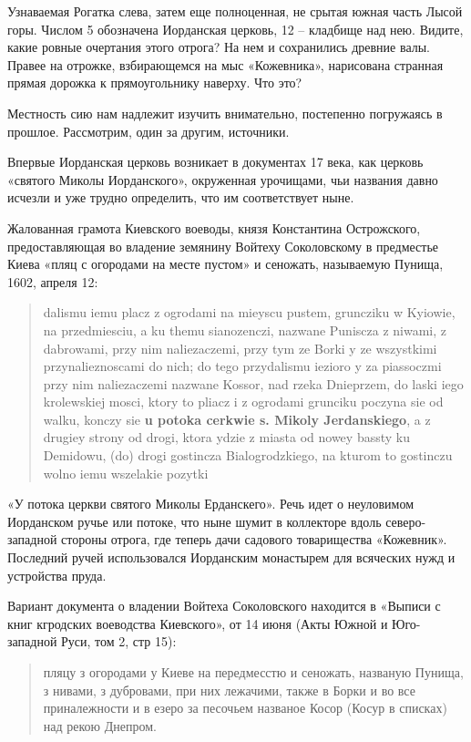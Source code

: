 Узнаваемая Рогатка слева, затем еще полноценная, не срытая южная часть Лысой горы. Числом 5 обозначена Иорданская церковь, 12 – кладбище над нею. Видите, какие ровные очертания этого отрога? На нем и сохранились древние валы. Правее на отрожке, взбирающемся на мыс «Кожевника», нарисована странная прямая дорожка к прямоугольнику наверху. Что это? 

Местность сию нам надлежит изучить внимательно, постепенно погружаясь в прошлое. Рассмотрим, один за другим, источники.

Впервые Иорданская церковь возникает в документах 17 века, как церковь «святого Миколы Иорданского», окруженная урочищами, чьи названия давно исчезли и уже трудно определить, что им соответствует ныне.

Жалованная грамота Киевского воеводы, князя Константина Острожского, предоставляющая во владение земянину Войтеху Соколовскому в предместье Киева «пляц с огородами на месте пустом» и сеножать, называемую Пунища, 1602, апреля 12:
\begin{otherlanguage}{polish}
\begin{quotation}
dalismu iemu placz z ogrodami na mieyscu pustem, gruncziku w Kyiowie, na przedmiesciu, a ku themu sianozenczi, nazwane Puniscza z niwami, z dabrowami, przy nim naliezaczemi, przy tym ze Borki y ze wszystkimi przynalieznoscami do nich; do tego przydalismu iezioro y za piassoczmi przy nim naliezaczemi nazwane Kossor, nad rzeka Dnieprzem, do laski iego krolewskiej mosci, ktory to pliacz i z ogrodami grunciku poczyna sie od walku, konczy sie \textbf{u potoka cerkwie s. Mikoly Jerdan\-skiego}, a z drugiey strony od drogi, ktora ydzie z miasta od nowey bassty ku Demidowu, (do) drogi gostincza Bialogrodzkiego, na kturom to gostinczu wolno iemu wszelakie pozytki
\end{quotation}
\end{otherlanguage}
«У потока церкви святого Миколы Ерданскего». Речь идет о неуловимом Иорданском ручье или потоке, что ныне шумит в коллекторе вдоль северо-западной стороны отрога, где теперь дачи садового товарищества «Кожевник». Последний ручей использовался Иорданским монастырем для всяческих нужд и устройства пруда.

Вариант документа о владении Войтеха Соколовского находится в «Выписи с книг кгродских воеводства Киевского», от 14 июня (Акты Южной и Юго-западной Руси, том 2, стр 15):

\begin{quotation}
пляцу з огородами у Киеве на передмесстю и сеножать, названую Пунища, з нивами, з дубровами, при них лежачими, также в Борки и во все приналежности и в езеро за песочьем названое Косор (Косур в списках) над рекою Днепром.
\end{quotation}

